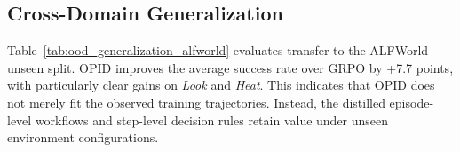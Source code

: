 \documentclass{llmxive}
\begin{document}

\subsection{Cross-Domain Generalization}
\label{app:ood_generalization}
Table~\ref{tab:ood_generalization_alfworld} evaluates transfer to the ALFWorld unseen split. OPID improves the average success rate over GRPO by +7.7 points, with particularly clear gains on \textit{Look} and \textit{Heat}. This indicates that OPID does not merely fit the observed training trajectories. Instead, the distilled episode-level workflows and step-level decision rules retain value under unseen environment configurations.
\end{document}
